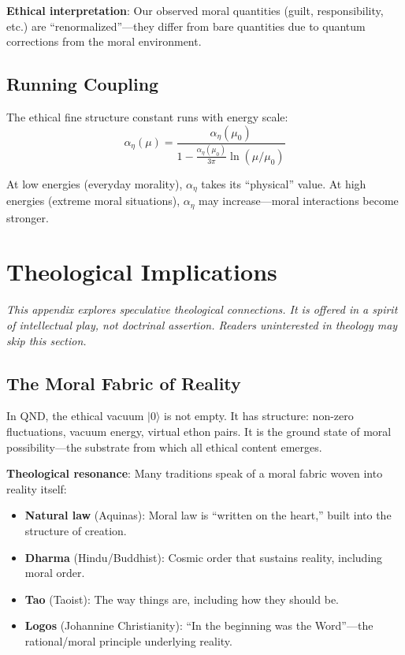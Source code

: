 \documentclass[12pt]{article}
\begin{document}
\textbf{Ethical interpretation}: Our observed moral quantities (guilt, responsibility, etc.) are ``renormalized''---they differ from bare quantities due to quantum corrections from the moral environment.

\subsection{Running Coupling}

The ethical fine structure constant runs with energy scale:
\begin{equation}
    \alpha_\eta(\mu) = \frac{\alpha_\eta(\mu_0)}{1 - \frac{\alpha_\eta(\mu_0)}{3\pi} \ln(\mu / \mu_0)}
\end{equation}

At low energies (everyday morality), $\alpha_\eta$ takes its ``physical'' value. At high energies (extreme moral situations), $\alpha_\eta$ may increase---moral interactions become stronger.

\section{Theological Implications}

\emph{This appendix explores speculative theological connections. It is offered in a spirit of intellectual play, not doctrinal assertion. Readers uninterested in theology may skip this section.}

\subsection{The Moral Fabric of Reality}

In QND, the ethical vacuum $|0\rangle$ is not empty. It has structure: non-zero fluctuations, vacuum energy, virtual ethon pairs. It is the ground state of moral possibility---the substrate from which all ethical content emerges.

\textbf{Theological resonance}: Many traditions speak of a moral fabric woven into reality itself:
\begin{itemize}
    \item \textbf{Natural law} (Aquinas): Moral law is ``written on the heart,'' built into the structure of creation.
    \item \textbf{Dharma} (Hindu/Buddhist): Cosmic order that sustains reality, including moral order.
    \item \textbf{Tao} (Taoist): The way things are, including how they should be.
    \item \textbf{Logos} (Johannine Christianity): ``In the beginning was the Word''---the rational/moral principle underlying reality.
\end{itemize}
\end{document}
